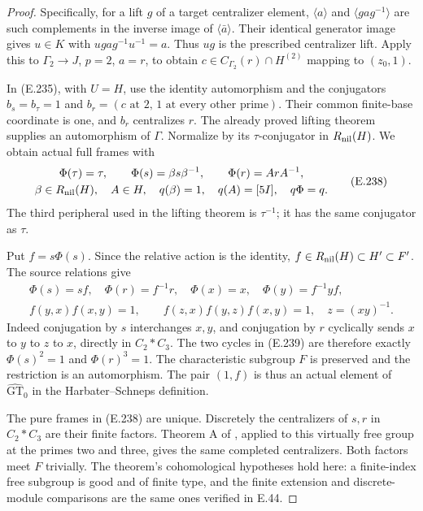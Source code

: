 \begin{proof}
Specifically, for a lift $g$ of a target
centralizer element, $\langle a\rangle$
and $\langle gag^{-1}\rangle$ are such
complements in the inverse image of
$\langle\bar a\rangle$. Their identical
generator image gives $u\in K$ with
$ugag^{-1}u^{-1}=a$. Thus $ug$ is the
prescribed centralizer lift.
Apply this to $\Gamma_2\to J$, $p=2$,
$a=r$, to obtain
$c\in C_{\Gamma_2}(r)\cap H^{(2)}$
mapping to $(z_0,1)$.

In (E.235), with $U=H$, use the identity
automorphism and the conjugators
$b_s=b_\tau=1$ and
$b_r=(c\text{ at }2,\,1\text{ at every other prime})$.
Their common finite-base coordinate is one,
and $b_r$ centralizes $r$. The already proved
lifting theorem supplies an automorphism
of $\Gamma$. Normalize by its
$\tau$-conjugator in $R_{\rm nil}(H)$.
We obtain actual full frames with
\[
 \begin{gathered}
 \Phi(\tau)=\tau,\qquad
 \Phi(s)=\beta s\beta^{-1},\qquad
 \Phi(r)=ArA^{-1},\\
 \beta\in R_{\rm nil}(H),\quad A\in H,\quad
 q(\beta)=1,\quad q(A)=[5I],\quad q\Phi=q.
 \end{gathered}                                                   \tag{E.238}
\]
The third peripheral used in the lifting
theorem is $\tau^{-1}$; it has the same
conjugator as $\tau$.

Put $f=s\Phi(s)$. Since the relative action
is the identity,
$f\in R_{\rm nil}(H)\subset H'\subset F'$.
The source relations give
\[
 \begin{gathered}
 \Phi(s)=sf,\quad \Phi(r)=f^{-1}r,\quad
 \Phi(x)=x,\quad \Phi(y)=f^{-1}yf,\\
 f(y,x)f(x,y)=1,\qquad
 f(z,x)f(y,z)f(x,y)=1,
       \quad z=(xy)^{-1}.
 \end{gathered}                                                   \tag{E.239}
\]
Indeed conjugation by $s$ interchanges $x,y$,
and conjugation by $r$ cyclically sends
$x$ to $y$ to $z$ to $x$, directly in
$C_2*C_3$. The two cycles in (E.239) are
therefore exactly $\Phi(s)^2=1$ and
$\Phi(r)^3=1$. The characteristic subgroup
$F$ is preserved and the restriction is
an automorphism. The pair $(1,f)$ is
thus an actual element of
$\widehat{\mathrm{GT}}_0$ in the
Harbater--Schneps definition.

The pure frames in (E.238) are unique.
Discretely the centralizers of $s,r$
in $C_2*C_3$ are their finite factors.
Theorem A of \cite{ET_BZ2024}, applied
to this virtually free group at the
primes two and three, gives the same
completed centralizers. Both factors
meet $F$ trivially. The theorem's
cohomological hypotheses hold here:
a finite-index free subgroup is good
and of finite type, and the finite
extension and discrete-module comparisons
are the same ones verified in E.44.


\end{proof}
